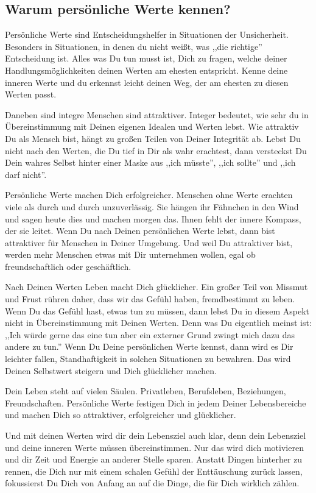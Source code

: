 \documentclass[../Lebensziel.tex]{subfiles}
\begin{document}
\subsection{Warum persönliche Werte kennen?}
Persönliche Werte sind Entscheidungshelfer in Situationen der Unsicherheit. Besonders in Situationen, in denen du nicht weißt, was ,,die richtige'' Entscheidung ist. Alles was Du tun musst ist, Dich zu fragen, welche deiner Handlungsmöglichkeiten deinen Werten am ehesten entspricht. Kenne deine inneren Werte und du erkennst leicht deinen Weg, der am ehesten zu diesen Werten passt.

Daneben sind integre Menschen sind attraktiver. Integer bedeutet, wie sehr du in Übereinstimmung mit Deinen eigenen Idealen und Werten lebst. Wie attraktiv Du als Mensch bist, hängt zu großen Teilen von Deiner Integrität ab. Lebst Du nicht nach den Werten, die Du tief in Dir als wahr erachtest, dann versteckst Du Dein wahres Selbst hinter einer Maske aus ,,ich müsste'', ,,ich sollte'' und ,,ich darf nicht''.

Persönliche Werte machen Dich erfolgreicher. Menschen ohne Werte erachten viele als durch und durch unzuverlässig. Sie hängen ihr Fähnchen in den Wind und sagen heute dies und machen morgen das. Ihnen fehlt der innere Kompass, der sie leitet. Wenn Du nach Deinen persönlichen Werte lebst, dann bist attraktiver für Menschen in Deiner Umgebung. Und weil Du attraktiver bist, werden mehr Menschen etwas mit Dir unternehmen wollen, egal ob freundschaftlich oder geschäftlich. 

Nach Deinen Werten Leben macht Dich glücklicher. Ein großer Teil von Missmut und Frust rühren daher, dass wir das Gefühl haben, fremdbestimmt zu leben. Wenn Du das Gefühl hast, etwas tun zu müssen, dann lebst Du in diesem Aspekt nicht in Übereinstimmung mit Deinen Werten. Denn was Du eigentlich meinst ist: ,,Ich würde gerne das eine tun aber ein externer Grund zwingt mich dazu das andere zu tun.'' 
Wenn Du Deine persönlichen Werte kennst, dann wird es Dir leichter fallen, Standhaftigkeit in solchen Situationen zu bewahren. Das wird Deinen Selbstwert steigern und Dich glücklicher machen.

Dein Leben steht auf vielen Säulen. Privatleben, Berufsleben, Beziehungen, Freundschaften. Persönliche Werte festigen Dich in jedem Deiner Lebensbereiche und machen Dich so attraktiver, erfolgreicher und glücklicher.

Und mit deinen Werten wird dir dein Lebensziel auch klar, denn dein Lebensziel und deine inneren Werte müssen übereinstimmen. Nur das wird dich motivieren und dir Zeit und Energie an anderer Stelle sparen. Anstatt Dingen hinterher zu rennen, die Dich nur mit einem schalen Gefühl der Enttäuschung zurück lassen, fokussierst Du Dich von Anfang an auf die Dinge, die für Dich wirklich zählen. 
\end{document}
